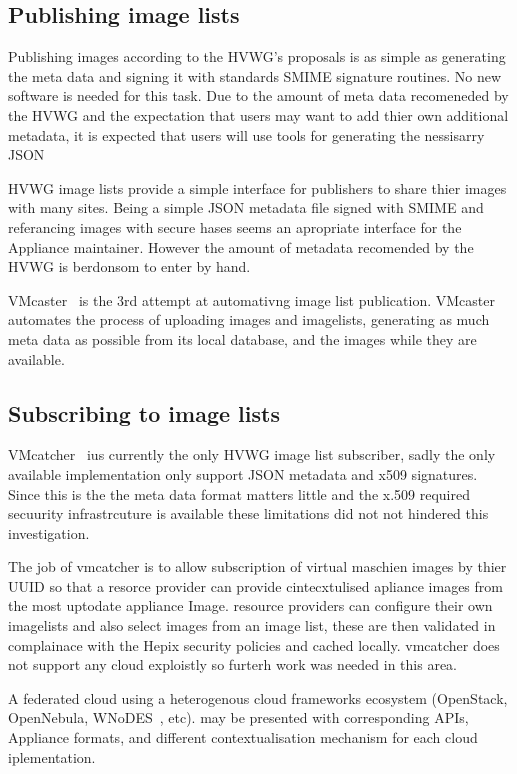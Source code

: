 \documentclass{llncs_Ibergrid2013}
\begin{document}
\subsection{Publishing image lists}
Publishing images according to the HVWG's proposals is as simple as generating the meta data and signing it with standards SMIME signature routines. No new software is needed for this task. Due to the amount of meta data recomeneded by the HVWG and the expectation that users may want to add thier own additional metadata, it is expected that users will use tools for generating the nessisarry JSON 

HVWG image lists provide a simple interface for publishers to share thier images with many sites. Being a simple JSON metadata file signed with SMIME and referancing images with secure hases seems an apropriate interface for the Appliance maintainer. However the amount of metadata recomended by the HVWG is berdonsom to enter by hand.
 
VMcaster~\cite{vmcaster} is the 3rd attempt at automativng image list publication. VMcaster~\cite{vmcaster} automates the process of uploading images and imagelists, generating as much meta data as possible from its local database, and the images while they are available.

\subsection{Subscribing to image lists}

VMcatcher~\cite{vmcatcher} ius currently the only HVWG image list subscriber, sadly the only available implementation only support JSON metadata and x509 signatures. Since this is the the meta data format matters little and the x.509 required secuurity infrastrcuture is available these limitations did not not hindered this investigation.

The job of vmcatcher is to allow subscription of virtual maschien images by thier UUID so that a resorce provider can provide cintecxtulised apliance images from the most uptodate appliance Image. resource providers can configure their own imagelists and also select images from an image list, these are then validated in complainace with the Hepix security policies and cached locally. vmcatcher does not support any cloud exploistly so furterh work was needed in this area.

A federated cloud using a heterogenous cloud frameworks ecosystem (OpenStack, OpenNebula, WNoDES~\cite{wnodes}, etc). may be presented with corresponding APIs, Appliance formats, and different contextualisation mechanism for each cloud iplementation.
\end{document}
